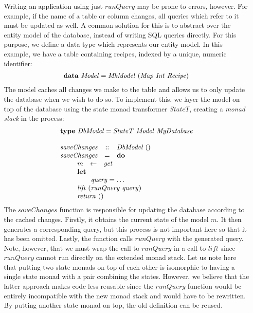 Writing an application using just $\mathit{runQuery}$ may be prone to errors, however. For example, if the name of a table or column changes, all queries which refer to it must be updated as well. A common solution for this is to abstract over the entity model of the database, instead of writing SQL queries directly. For this purpose, we define a data type which represents our entity model. In this example, we have a table containing recipes, indexed by a unique, numeric identifier:
\begin{displaymath}
\begin{array}{lcl}
\multicolumn{3}{l}{\mathbf{data}~\mathit{Model} = \mathit{MkModel}~(\mathit{Map}~\mathit{Int}~\mathit{Recipe})}
\end{array}
\end{displaymath}
The model caches all changes we make to the table and allows us to only update the database when we wish to do so. To implement this, we layer the model on top of the database using the state monad transformer $\mathit{StateT}$, creating a \emph{monad stack} in the process:
\begin{displaymath}
\begin{array}{lcl}
\multicolumn{3}{l}{\mathbf{type}~\mathit{DbModel} = \mathit{StateT}~\mathit{Model}~\mathit{MyDatabase}}\\\\
\mathit{saveChanges} & :: & \mathit{DbModel}~() \\
\mathit{saveChanges} & = & \mathbf{do} \\
\multicolumn{3}{l}{\qquad \begin{array}{lcl}
    m & \leftarrow & \mathit{get} \\
    \multicolumn{3}{l}{\mathbf{let}} \\
    \multicolumn{3}{l}{\qquad \mathit{query} = \ldots} \\
    \multicolumn{3}{l}{\mathit{lift}~(\mathit{runQuery}~\mathit{query})}\\
    \multicolumn{3}{l}{\mathit{return}~()}
\end{array} }
\end{array}
\end{displaymath}
The $\mathit{saveChanges}$ function is responsible for updating the database according to the cached changes. Firstly, it obtains the current state of the model $m$. It then generates a corresponding query, but this process is not important here so that it has been omitted. Lastly, the function calls $\mathit{runQuery}$ with the generated query. Note, however, that we must wrap the call to $\mathit{runQuery}$ in a call to $\mathit{lift}$ since $\mathit{runQuery}$ cannot run directly on the extended monad stack. Let us note here that putting two state monads on top of each other is isomorphic to having a single state monad with a pair combining the states. However, we believe that the latter approach makes code less reusable since the $\mathit{runQuery}$ function would be entirely incompatible with the new monad stack and would have to be rewritten. By putting another state monad on top, the old definition can be reused.

